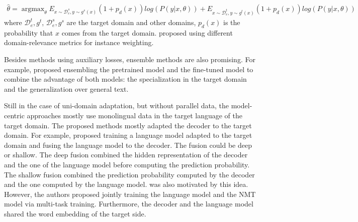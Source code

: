 \begin{equation}
\begin{array}{rcl}
\hat{\theta} = \displaystyle{\mathop{\arg max}_{\theta}} E_{x \sim \mathcal{D}_e^s, y \sim g^s(x)} (1+p_d(x))log(P(y|x,\theta)) + E_{x \sim \mathcal{D}_e^t, y \sim g^t(x)} (1+p_d(x))log(P(y|x,\theta))
\end{array}
\end{equation}
where $\mathcal{D}_e^t, g^t$, $\mathcal{D}_e^s, g^s$ are the target domain and other domains, $p_d(x)$ is the probability that $x$ comes from the target domain. \citet{Wang17instance} proposed using different domain-relevance metrics for instance weighting. 

Besides methods using auxiliary losses, ensemble methods are also promising. For example, \citet{Freitag16fast} proposed ensembling the pretrained model and the fine-tuned model to combine the advantage of both models: the specialization in the target domain and the generalization over general text.

Still in the case of uni-domain adaptation, but without parallel data, the model-centric approaches mostly use monolingual data in the target language of the target domain. The proposed methods mostly adapted the decoder to the target domain. For example, \citet{Gulcehre16monolingual} proposed training a language model adapted to the target domain and fusing the language model to the decoder. The fusion could be deep or shallow. The deep fusion combined the hidden representation of the decoder and the one of the language model before computing the prediction probability. The shallow fusion combined the prediction probability computed by the decoder and the one computed by the language model. \citet{Domhan17using} was also motivated by this idea. However, the authors proposed jointly training the language model and the NMT model via multi-task training. Furthermore, the decoder and the language model shared the word embedding of the target side.

